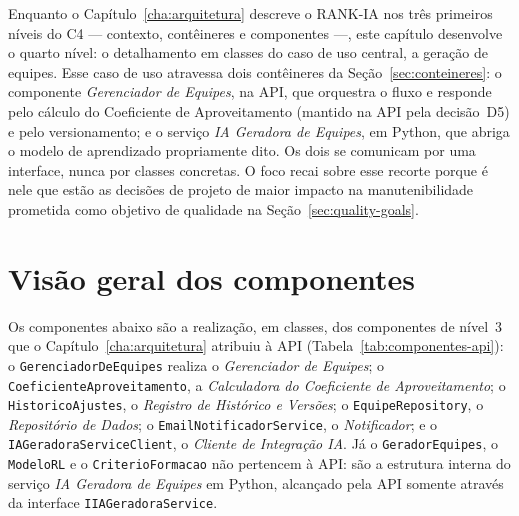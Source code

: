 \documentclass[a4paper,12pt,oneside,openany]{book}
\newif\iforientacoes
\newcommand{\orientacao}[1]{%
    \iforientacoes
        \begin{quote}
        \small\itshape\textbf{Orientação:} #1
        \end{quote}
    \fi
}
\begin{document}

Enquanto o Capítulo~\ref{cha:arquitetura} descreve o RANK-IA nos três primeiros
níveis do C4 --- contexto, contêineres e componentes ---, este capítulo desenvolve
o quarto nível: o detalhamento em classes do caso de uso central, a geração de
equipes. Esse caso de uso atravessa dois contêineres da
Seção~\ref{sec:conteineres}: o componente \emph{Gerenciador de Equipes}, na API,
que orquestra o fluxo e responde pelo cálculo do Coeficiente de Aproveitamento
(mantido na API pela decisão~D5) e pelo versionamento; e o serviço \emph{IA
Geradora de Equipes}, em Python, que abriga o modelo de aprendizado propriamente
dito. Os dois se comunicam por uma interface, nunca por classes concretas. O foco
recai sobre esse recorte porque é nele que estão as decisões de projeto de maior
impacto na manutenibilidade prometida como objetivo de qualidade na
Seção~\ref{sec:quality-goals}.

\section{Visão geral dos componentes}

\orientacao{Listem os principais componentes e suas responsabilidades. Para
sistemas maiores, esta visão geral pode cobrir todos os componentes, enquanto
o detalhamento das seções seguintes pode se concentrar apenas nos mais
relevantes ou complexos.}

Os componentes abaixo são a realização, em classes, dos componentes de nível~3
que o Capítulo~\ref{cha:arquitetura} atribuiu à API
(Tabela~\ref{tab:componentes-api}): o \texttt{GerenciadorDeEquipes} realiza o
\emph{Gerenciador de Equipes}; o \texttt{CoeficienteAproveitamento}, a
\emph{Calculadora do Coeficiente de Aproveitamento}; o \texttt{HistoricoAjustes},
o \emph{Registro de Histórico e Versões}; o \texttt{EquipeRepository}, o
\emph{Repositório de Dados}; o \texttt{EmailNotificadorService}, o
\emph{Notificador}; e o \texttt{IAGeradoraServiceClient}, o \emph{Cliente de
Integração IA}. Já o \texttt{GeradorEquipes}, o \texttt{ModeloRL} e o
\texttt{CriterioFormacao} não pertencem à
API: são a estrutura interna do serviço \emph{IA Geradora de Equipes} em Python,
alcançado pela API somente através da interface \texttt{IIAGeradoraService}.
\end{document}
